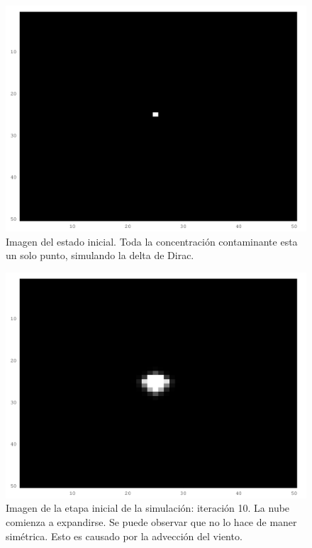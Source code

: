 \documentclass[twocolumn,a4paper,10pt]{article}
\begin{document}
\begin{figure}[H]
        \includegraphics[width=\linewidth]{./images/iteration-1.png}
        \caption{Imagen del estado inicial. Toda la concentraci\'on contaminante esta un solo punto, simulando la delta de Dirac.}
        \label{fig:inicial}
\end{figure}

\begin{figure}[H]
        \includegraphics[width=\linewidth]{./images/iteration-10.png}
        \caption{Imagen de la etapa inicial de la simulaci\'on: iteraci\'on 10. La nube comienza a expandirse. Se puede observar que no lo hace de maner sim\'etrica. 
        Esto es causado por la advecci\'on del viento.}
        \label{fig:10-iteraciones}
\end{figure}
\end{document}
